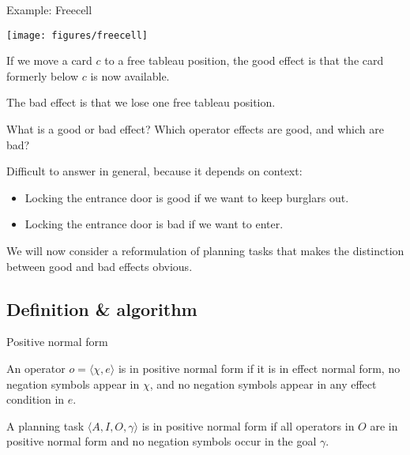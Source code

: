 \documentclass{gkibeamer}
\begin{document}
\begin{frame}{Example: Freecell}
\begin{center}
    \texttt{[image: figures/freecell]}
\end{center}
 \begin{example}
   If we move a card $c$ to a free tableau position, the \alert{good
     effect} is that the card formerly below $c$ is now available.

   The \alert{bad effect} is that we lose one free tableau position.
 \end{example}
\end{frame}

\begin{frame}{What is a good or bad effect?}
   Which operator effects are good, and which are
  bad?

  \medskip
  
  Difficult to answer in general, because it depends on
  context:
  \begin{itemize}
  \item Locking the entrance door is \alert{good} if we want to keep
    burglars out.
  \item Locking the entrance door is \alert{bad} if we want to enter.
  \end{itemize}

  We will now consider a reformulation of planning tasks that makes
  the distinction between good and bad effects obvious.
\end{frame}

\subsection{Definition \& algorithm}

\begin{frame}{Positive normal form}
  \begin{definition}
    An operator $o = \langle \chi, e \rangle$ is in \alert{positive normal
      form} if it is in effect normal form, no negation symbols appear in
      $\chi$, and no negation symbols appear in any effect condition in $e$.
  \end{definition}

  \begin{definition}
    A planning task $\langle A,I,O,\gamma\rangle$ is in \alert{positive
      normal form} if all operators in $O$ are in positive normal form
    and no negation symbols occur in the goal $\gamma$.
  \end{definition}
\end{frame}
\end{document}
